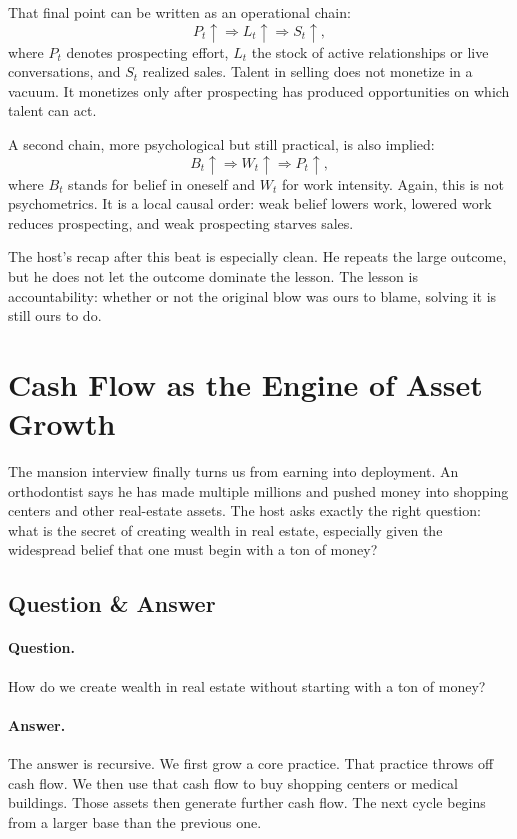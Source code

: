 That final point can be written as an operational chain:
\begin{equation}
P_t \uparrow \Rightarrow L_t \uparrow \Rightarrow S_t \uparrow,
\end{equation}
where \(P_t\) denotes prospecting effort, \(L_t\) the stock of active relationships or live conversations, and \(S_t\) realized sales. Talent in selling does not monetize in a vacuum. It monetizes only after prospecting has produced opportunities on which talent can act.

A second chain, more psychological but still practical, is also implied:
\begin{equation}
B_t \uparrow \Rightarrow W_t \uparrow \Rightarrow P_t \uparrow,
\end{equation}
where \(B_t\) stands for belief in oneself and \(W_t\) for work intensity. Again, this is not psychometrics. It is a local causal order: weak belief lowers work, lowered work reduces prospecting, and weak prospecting starves sales.

The host's recap after this beat is especially clean. He repeats the large outcome, but he does not let the outcome dominate the lesson. The lesson is accountability: whether or not the original blow was ours to blame, solving it is still ours to do.

\section{Cash Flow as the Engine of Asset Growth}

The mansion interview finally turns us from earning into deployment. An orthodontist says he has made multiple millions and pushed money into shopping centers and other real-estate assets. The host asks exactly the right question: what is the secret of creating wealth in real estate, especially given the widespread belief that one must begin with a ton of money?

\subsection{Question \& Answer}

\paragraph{Question.} How do we create wealth in real estate without starting with a ton of money?

\paragraph{Answer.} The answer is recursive. We first grow a core practice. That practice throws off cash flow. We then use that cash flow to buy shopping centers or medical buildings. Those assets then generate further cash flow. The next cycle begins from a larger base than the previous one.

